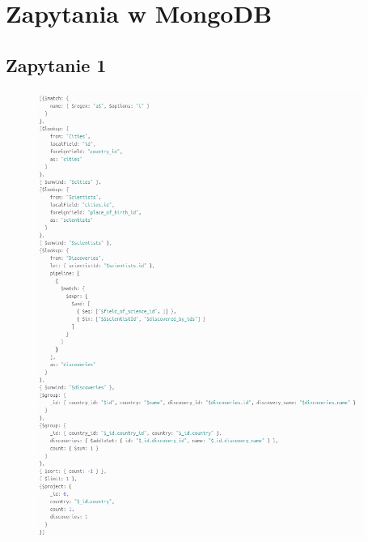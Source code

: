 \documentclass[11pt]{article}
\begin{document}
\newpage
\section{Zapytania w MongoDB}
	\subsection{Zapytanie 1}
		\begin{figure}[!ht]
			\begin{center}
				\includegraphics[width=400px]{m1.png}
			\end{center}
		\end{figure}

\newpage
\end{document}
